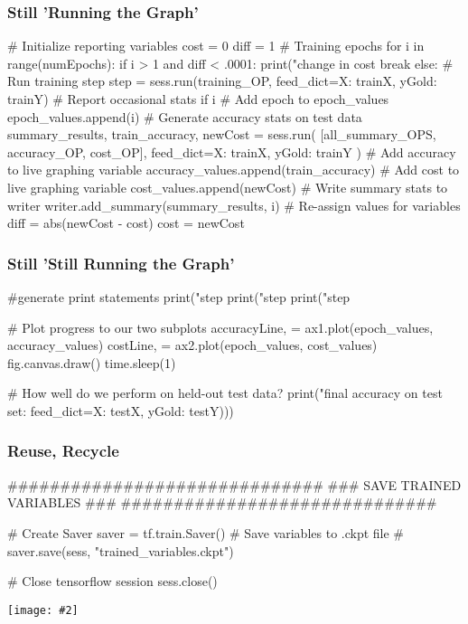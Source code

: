 \documentclass[14pt]{beamer}
\newcommand {\framedgraphic}[2] { %
    \begin{frame}{#1}
        \begin{center}
            \texttt{[image: \#2]}
        \end{center}
    \end{frame}
}
\begin{document}
\begin{frame}[fragile]
  \frametitle{Still 'Running the Graph'}
  \begin{python}
# Initialize reporting variables
cost = 0
diff = 1
# Training epochs
for i in range(numEpochs):
    if i > 1 and diff < .0001:
        print("change in cost %
        break
    else:
        # Run training step
        step = sess.run(training_OP, feed_dict={X: trainX, yGold: trainY})
        # Report occasional stats
        if i %
            # Add epoch to epoch_values
            epoch_values.append(i)
            # Generate accuracy stats on test data
            summary_results, train_accuracy, newCost = sess.run(
                [all_summary_OPS, accuracy_OP, cost_OP], 
                feed_dict={X: trainX, yGold: trainY}
            )
            # Add accuracy to live graphing variable
            accuracy_values.append(train_accuracy)
            # Add cost to live graphing variable
            cost_values.append(newCost)
            # Write summary stats to writer
            writer.add_summary(summary_results, i)
            # Re-assign values for variables
            diff = abs(newCost - cost)
            cost = newCost
  \end{python}
\end{frame}

\begin{frame}[fragile]
  \frametitle{Still 'Still Running the Graph'}
  \begin{python}
            #generate print statements
            print("step %
            print("step %
            print("step %

            # Plot progress to our two subplots
            accuracyLine, = ax1.plot(epoch_values, accuracy_values)
            costLine, = ax2.plot(epoch_values, cost_values)
            fig.canvas.draw()
            time.sleep(1)


# How well do we perform on held-out test data?
print("final accuracy on test set: %
                                                 feed_dict={X: testX, 
                                                        yGold: testY})))
  \end{python}
\end{frame}

\begin{frame}[fragile]
  \frametitle{Reuse, Recycle}
  \begin{python}
##############################
### SAVE TRAINED VARIABLES ###
##############################

# Create Saver
saver = tf.train.Saver()
# Save variables to .ckpt file
# saver.save(sess, "trained_variables.ckpt")

# Close tensorflow session
sess.close()
  \end{python}
\end{frame}

\framedgraphic{}{thats-all-folks.jpg}
\end{document}
